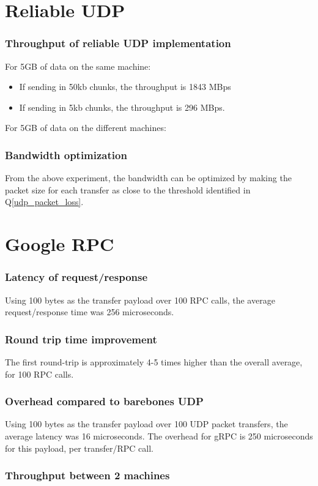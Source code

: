 \documentclass[a4paper]{article}
\begin{document}
\part{Reliable UDP}

\section{Throughput of reliable UDP implementation}
For 5GB of data on the same machine:
\begin{itemize}
	\item If sending in 50kb chunks, the throughput is 1843 MBps
	\item If sending in 5kb chunks, the throughput is 296 MBps.
\end{itemize}

For 5GB of data on the different machines:


\section{Bandwidth optimization}
From the above experiment, the bandwidth can be optimized by making the packet size for each transfer as close to the threshold identified in Q\ref{udp_packet_loss}.

\part{Google RPC}

\section{Latency of request/response}
Using 100 bytes as the transfer payload over 100 RPC calls, the average request/response time was 256 microseconds.

\section{Round trip time improvement}
The first round-trip is approximately 4-5 times higher than the overall average, for 100 RPC calls.

\section{Overhead compared to barebones UDP}
Using 100 bytes as the transfer payload over 100 UDP packet transfers, the average latency was 16 microseconds. 
The overhead for gRPC is 250 microseconds for this payload, per transfer/RPC call.

\section{Throughput between 2 machines}
\end{document}
